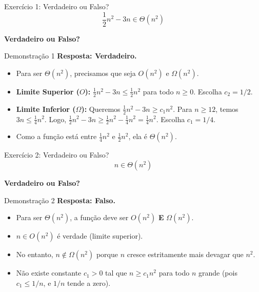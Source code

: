\documentclass[aspectratio=169]{beamer}
\begin{document}
\begin{frame}{Exercício 1: Verdadeiro ou Falso?}
    \Large
    \[ \frac{1}{2}n^2 - 3n \in \Theta(n^2) \]
    \begin{center}
        \textbf{Verdadeiro ou Falso?}
    \end{center}
\end{frame}

\begin{frame}{Demonstração 1}
    \textbf{Resposta: Verdadeiro.}
    \begin{itemize}
        \item Para ser $\Theta(n^2)$, precisamos que seja $O(n^2)$ e $\Omega(n^2)$.
        \item \textbf{Limite Superior ($O$):} $\frac{1}{2}n^2 - 3n \le \frac{1}{2}n^2$ para todo $n \ge 0$. Escolha $c_2 = 1/2$.
        \item \textbf{Limite Inferior ($\Omega$):} Queremos $\frac{1}{2}n^2 - 3n \ge c_1 n^2$. 
        Para $n \ge 12$, temos $3n \le \frac{1}{4}n^2$.
        Logo, $\frac{1}{2}n^2 - 3n \ge \frac{1}{2}n^2 - \frac{1}{4}n^2 = \frac{1}{4}n^2$. Escolha $c_1 = 1/4$.
        \item Como a função está entre $\frac{1}{4}n^2$ e $\frac{1}{2}n^2$, ela é $\Theta(n^2)$.
    \end{itemize}
\end{frame}

\begin{frame}{Exercício 2: Verdadeiro ou Falso?}
    \Large
    \[ n \in \Theta(n^2) \]
    \begin{center}
        \textbf{Verdadeiro ou Falso?}
    \end{center}
\end{frame}

\begin{frame}{Demonstração 2}
    \textbf{Resposta: Falso.}
    \begin{itemize}
        \item Para ser $\Theta(n^2)$, a função deve ser $O(n^2)$ \textbf{E} $\Omega(n^2)$.
        \item $n \in O(n^2)$ é verdade (limite superior).
        \item No entanto, $n \notin \Omega(n^2)$ porque $n$ cresce estritamente mais devagar que $n^2$. 
        \item Não existe constante $c_1 > 0$ tal que $n \ge c_1 n^2$ para todo $n$ grande (pois $c_1 \le 1/n$, e $1/n$ tende a zero).
    \end{itemize}
\end{frame}
\end{document}
